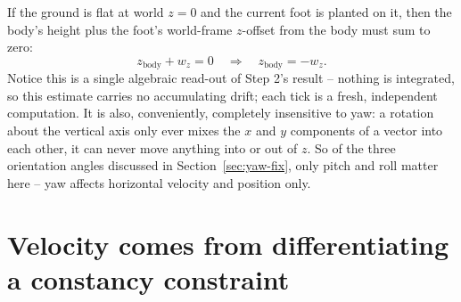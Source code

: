 \documentclass[11pt]{article}
\begin{document}
If the ground is flat at world $z=0$ and the current foot is planted on it,
then the body's height plus the foot's world-frame $z$-offset from the body
must sum to zero:
\begin{equation}
z_{\text{body}} + w_z = 0 \quad\Longrightarrow\quad z_{\text{body}} = -w_z.
\end{equation}
Notice this is a single algebraic read-out of Step 2's result -- nothing is
integrated, so this estimate carries no accumulating drift; each tick is a
fresh, independent computation. It is also, conveniently, completely
insensitive to yaw: a rotation about the vertical axis only ever mixes the
$x$ and $y$ components of a vector into each other, it can never move
anything into or out of $z$. So of the three orientation angles discussed
in Section~\ref{sec:yaw-fix}, only pitch and roll matter here -- yaw affects
horizontal velocity and position only.

\section{Velocity comes from differentiating a constancy constraint}
\end{document}
